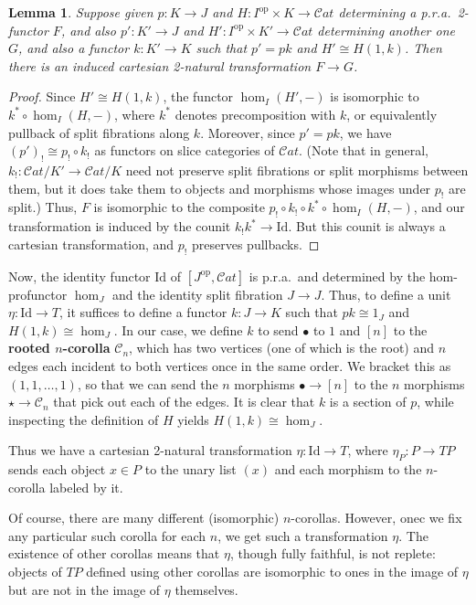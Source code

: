 \documentclass{article}
\newtheorem{lem}[thm]{Lemma}
\theoremstyle{definition}
\theoremstyle{remark}
\def\C{\mathcal{C}}
\def\Cat{\ensuremath{\mathcal{C}\mathit{at}}}
\def\Id{\mathrm{Id}}
\def\op{^{\mathrm{op}}}
\begin{document}
\begin{lem}
  Suppose given $p:K\to J$ and $H:I\op \times K\to \Cat$ determining a p.r.a.\ 2-functor $F$, and also $p':K'\to J$ and $H':I\op\times K'\to\Cat$ determining another one $G$, and also a functor $k:K'\to K$ such that $p' = p k$ and $H' \cong H(1,k)$.
  Then there is an induced cartesian 2-natural transformation $F\to G$.
\end{lem}
\begin{proof}
  Since $H' \cong H(1,k)$, the functor $\hom_I(H',-)$ is isomorphic to $k^* \circ \hom_I(H,-)$, where $k^*$ denotes precomposition with $k$, or equivalently pullback of split fibrations along $k$.
  Moreover, since $p' = p k$, we have $(p')_! \cong p_! \circ k_!$ as functors on slice categories of \Cat.
  (Note that in general, $k_! : \Cat/K' \to \Cat/K$ need not preserve split fibrations or split morphisms between them, but it does take them to objects and morphisms whose images under $p_!$ are split.)
  Thus, $F$ is isomorphic to the composite $p_! \circ k_! \circ k^* \circ \hom_I(H,-)$, and our transformation is induced by the counit $k_! k^* \to \Id$.
  But this counit is always a cartesian transformation, and $p_!$ preserves pullbacks.
\end{proof}

Now, the identity functor $\Id$ of $[J\op,\Cat]$ is p.r.a.\ and determined by the hom-profunctor $\hom_J$ and the identity split fibration $J\to J$.
Thus, to define a unit $\eta : \Id \to T$, it suffices to define a functor $k:J\to K$ such that $p k\cong 1_J$ and $H(1,k) \cong \hom_J$.
In our case, we define $k$ to send $\bullet$ to $1$ and $[n]$ to the \textbf{rooted $n$-corolla} $\C_n$, which has two vertices (one of which is the root) and $n$ edges each incident to both vertices once in the same order.
We bracket this as $(1,1,\dots,1)$, so that we can send the $n$ morphisms $\bullet \to [n]$ to the $n$ morphisms $\star\to \C_n$ that pick out each of the edges.
It is clear that $k$ is a section of $p$, while inspecting the definition of $H$ yields $H(1,k) \cong \hom_J$.

Thus we have a cartesian 2-natural transformation $\eta : \Id\to T$, where $\eta_P : P \to T P$ sends each object $x\in P$ to the unary list $(x)$ and each morphism to the $n$-corolla labeled by it.

Of course, there are many different (isomorphic) $n$-corollas.
However, onec we fix any particular such corolla for each $n$, we get such a transformation $\eta$.
The existence of other corollas means that $\eta$, though fully faithful, is not replete: objects of $TP$ defined using other corollas are isomorphic to ones in the image of $\eta$ but are not in the image of $\eta$ themselves.
\end{document}
